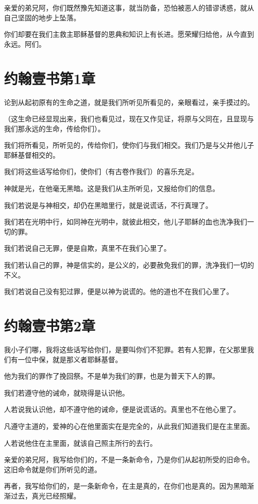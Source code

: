 \documentclass[12pt,oneside]{book}
\begin{document}
亲爱的弟兄阿，你们既然豫先知道这事，就当防备，恐怕被恶人的错谬诱惑，就从自己坚固的地步上坠落。

你们却要在我们主救主耶稣基督的恩典和知识上有长进。愿荣耀归给他，从今直到永远。阿们。

\chapter{约翰壹书第1章}
论到从起初原有的生命之道，就是我们所听见所看见的，亲眼看过，亲手摸过的。

（这生命已经显现出来，我们也看见过，现在又作见证，将原与父同在，且显现与我们那永远的生命，传给你们）。

我们将所看见，所听见的，传给你们，使你们与我们相交。我们乃是与父并他儿子耶稣基督相交的。

我们将这些话写给你们，使你们（有古卷作我们）的喜乐充足。

神就是光，在他毫无黑暗。这是我们从主所听见，又报给你们的信息。

我们若说是与神相交，却仍在黑暗里行，就是说谎话，不行真理了。

我们若在光明中行，如同神在光明中，就彼此相交，他儿子耶稣的血也洗净我们一切的罪。

我们若说自己无罪，便是自欺，真里不在我们心里了。

我们若认自己的罪，神是信实的，是公义的，必要赦免我们的罪，洗净我们一切的不义。

我们若说自己没有犯过罪，便是以神为说谎的。他的道也不在我们心里了。

\chapter{约翰壹书第2章}
我小子们哪，我将这些话写给你们，是要叫你们不犯罪。若有人犯罪，在父那里我们有一位中保，就是那义者耶稣基督。

他为我们的罪作了挽回祭。不是单为我们的罪，也是为普天下人的罪。

我们若遵守他的诫命，就晓得是认识他。

人若说我认识他，却不遵守他的诫命，便是说谎话的。真里也不在他心里了。

凡遵守主道的，爱神的心在他里面实在是完全的，从此我们知道我们是在主里面。

人若说他住在主里面，就该自己照主所行的去行。

亲爱的弟兄阿，我写给你们的，不是一条新命令，乃是你们从起初所受的旧命令。这旧命令就是你们所听见的道。

再者，我写给你们的，是一条新命令，在主是真的，在你们也是真的。因为黑暗渐渐过去，真光已经照耀。
\end{document}
